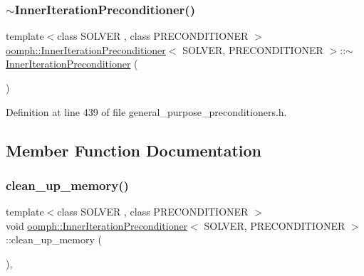 \mbox{\label{classoomph_1_1InnerIterationPreconditioner_a6d771bae31ff01e9f9b4578208acae14}} 
\subsubsection{\texorpdfstring{$\sim$\+Inner\+Iteration\+Preconditioner()}{~InnerIterationPreconditioner()}}
{\footnotesize\ttfamily template$<$class S\+O\+L\+V\+ER , class P\+R\+E\+C\+O\+N\+D\+I\+T\+I\+O\+N\+ER $>$ \\
\hyperlink{classoomph_1_1InnerIterationPreconditioner}{oomph\+::\+Inner\+Iteration\+Preconditioner}$<$ S\+O\+L\+V\+ER, P\+R\+E\+C\+O\+N\+D\+I\+T\+I\+O\+N\+ER $>$\+::$\sim$\hyperlink{classoomph_1_1InnerIterationPreconditioner}{Inner\+Iteration\+Preconditioner} (\begin{DoxyParamCaption}{ }\end{DoxyParamCaption})\hspace{0.3cm}{\ttfamily [inline]}}



Definition at line 439 of file general\+\_\+purpose\+\_\+preconditioners.\+h.



\subsection{Member Function Documentation}
\mbox{\label{classoomph_1_1InnerIterationPreconditioner_a15c06204c6555fc4228fda0c71fcfce8}} 
\subsubsection{\texorpdfstring{clean\+\_\+up\+\_\+memory()}{clean\_up\_memory()}}
{\footnotesize\ttfamily template$<$class S\+O\+L\+V\+ER , class P\+R\+E\+C\+O\+N\+D\+I\+T\+I\+O\+N\+ER $>$ \\
void \hyperlink{classoomph_1_1InnerIterationPreconditioner}{oomph\+::\+Inner\+Iteration\+Preconditioner}$<$ S\+O\+L\+V\+ER, P\+R\+E\+C\+O\+N\+D\+I\+T\+I\+O\+N\+ER $>$\+::clean\+\_\+up\+\_\+memory (\begin{DoxyParamCaption}{ }\end{DoxyParamCaption})\hspace{0.3cm}{\ttfamily [inline]}, {\ttfamily [virtual]}}



